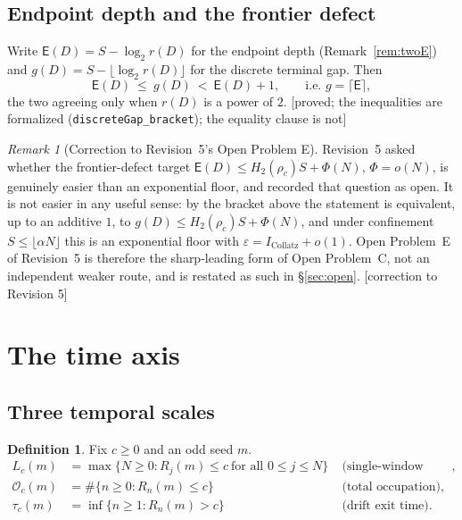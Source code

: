 \documentclass[11pt]{article}
\theoremstyle{plain}
\theoremstyle{definition}
\newtheorem{definition}[theorem]{Definition}
\theoremstyle{remark}
\newtheorem{remark}[theorem]{Remark}
\newcommand{\Occ}{\mathcal{O}}
\newcommand{\Edep}{\mathsf{E}}          %
\newcommand{\al}{\alpha}
\newcommand{\status}[1]{\textsf{\footnotesize[#1]}}
\begin{document}
\subsection{Endpoint depth and the frontier defect}\label{sec:gap}

Write $\Edep(D)=S-\log_2 r(D)$ for the endpoint depth (Remark~\ref{rem:twoE}) and
$g(D)=S-\lfloor\log_2 r(D)\rfloor$ for the discrete terminal gap. Then
\[
\Edep(D)\ \le\ g(D)\ <\ \Edep(D)+1,\qquad\text{i.e. } g=\lceil \Edep\rceil ,
\]
the two agreeing only when $r(D)$ is a power of $2$.
\status{proved; the inequalities are formalized
(\texttt{discreteGap\_bracket}); the equality clause is not}

\begin{remark}[Correction to Revision~5's Open Problem E]\label{rem:OPE}
Revision~5 asked whether the frontier-defect target
$\Edep(D)\le H_2(\rho_c)S+\Phi(N)$, $\Phi=o(N)$, is genuinely easier than an exponential floor, and
recorded that question as open. It is not easier in any useful sense: by the bracket above the
statement is equivalent, up to an additive $1$, to $g(D)\le H_2(\rho_c)S+\Phi(N)$, and under
confinement $S\le\lfloor\al N\rfloor$ this is an exponential floor with
$\varepsilon=I_{\mathrm{Collatz}}+o(1)$. Open Problem~E of Revision~5 is therefore the
sharp-leading form of Open Problem~C, not an independent weaker route, and is restated as such in
\S\ref{sec:open}. \status{correction to Revision 5}
\end{remark}

\section{The time axis}\label{sec:time}

\subsection{Three temporal scales}

\begin{definition}\label{def:times}
Fix $c\ge0$ and an odd seed $m$.
\begin{align*}
L_c(m)&=\max\{N\ge0: R_j(m)\le c\ \text{for all }0\le j\le N\} &&\text{(single-window lifetime)},\\
\Occ_c(m)&=\#\{n\ge0:R_n(m)\le c\} &&\text{(total occupation)},\\
\tau_c(m)&=\inf\{n\ge1:R_n(m)>c\} &&\text{(drift exit time)} .
\end{align*}
\end{definition}
\end{document}
